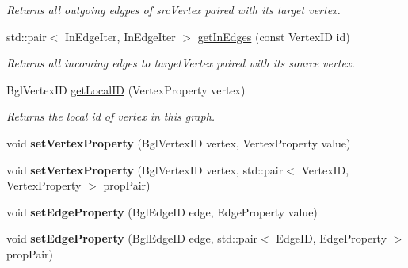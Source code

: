 \begin{DoxyCompactItemize}
\begin{DoxyCompactList}\small\item\em Returns all outgoing edgpes of {\itshape src\+Vertex} paired with its target vertex. \end{DoxyCompactList}\item 
\hypertarget{classgraybat_1_1graphPolicy_1_1BGL_aed44e414d59e72afee296f92a78917ec}{}std\+::pair$<$ In\+Edge\+Iter, In\+Edge\+Iter $>$ \hyperlink{classgraybat_1_1graphPolicy_1_1BGL_aed44e414d59e72afee296f92a78917ec}{get\+In\+Edges} (const Vertex\+I\+D id)\label{classgraybat_1_1graphPolicy_1_1BGL_aed44e414d59e72afee296f92a78917ec}

\begin{DoxyCompactList}\small\item\em Returns all incoming edges to {\itshape target\+Vertex} paired with its source vertex. \end{DoxyCompactList}\item 
Bgl\+Vertex\+I\+D \hyperlink{classgraybat_1_1graphPolicy_1_1BGL_a93884489eaf5a2b8367c1cf04c0a3434}{get\+Local\+I\+D} (Vertex\+Property vertex)
\begin{DoxyCompactList}\small\item\em Returns the local id of {\itshape vertex} in this graph. \end{DoxyCompactList}\item 
\hypertarget{classgraybat_1_1graphPolicy_1_1BGL_aed8f8b55547a5a6c92d7f711a9a0fe83}{}void {\bfseries set\+Vertex\+Property} (Bgl\+Vertex\+I\+D vertex, Vertex\+Property value)\label{classgraybat_1_1graphPolicy_1_1BGL_aed8f8b55547a5a6c92d7f711a9a0fe83}

\item 
\hypertarget{classgraybat_1_1graphPolicy_1_1BGL_a4b6d62720736780aa068b624bdf29ab7}{}void {\bfseries set\+Vertex\+Property} (Bgl\+Vertex\+I\+D vertex, std\+::pair$<$ Vertex\+I\+D, Vertex\+Property $>$ prop\+Pair)\label{classgraybat_1_1graphPolicy_1_1BGL_a4b6d62720736780aa068b624bdf29ab7}

\item 
\hypertarget{classgraybat_1_1graphPolicy_1_1BGL_a9c71ddaa997554f110b060218e956a8f}{}void {\bfseries set\+Edge\+Property} (Bgl\+Edge\+I\+D edge, Edge\+Property value)\label{classgraybat_1_1graphPolicy_1_1BGL_a9c71ddaa997554f110b060218e956a8f}

\item 
\hypertarget{classgraybat_1_1graphPolicy_1_1BGL_a1fb088ef6256a68b8999c7b4c04be17d}{}void {\bfseries set\+Edge\+Property} (Bgl\+Edge\+I\+D edge, std\+::pair$<$ Edge\+I\+D, Edge\+Property $>$ prop\+Pair)\label{classgraybat_1_1graphPolicy_1_1BGL_a1fb088ef6256a68b8999c7b4c04be17d}


\end{DoxyCompactItemize}
